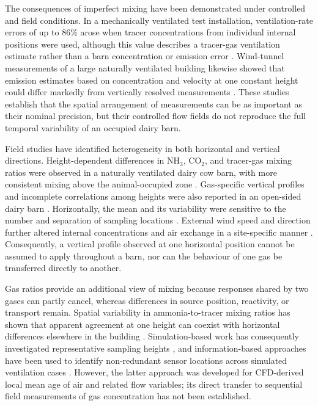 \documentclass[12pt,a4paper]{article}
\begin{document}
The consequences of imperfect mixing have been demonstrated under controlled
and field conditions. In a mechanically ventilated test installation,
ventilation-rate errors of up to 86\% arose when tracer concentrations from
individual internal positions were used, although this value describes a
tracer-gas ventilation estimate rather than a barn concentration or emission
error \citep{VanBuggenhout2009}. Wind-tunnel measurements of a large naturally
ventilated building likewise showed that emission estimates based on
concentration and velocity at one constant height could differ markedly from
vertically resolved measurements \citep{Janke2020}. These studies establish
that the spatial arrangement of measurements can be as important as their
nominal precision, but their controlled flow fields do not reproduce the full
temporal variability of an occupied dairy barn.

Field studies have identified heterogeneity in both horizontal and vertical
directions. Height-dependent differences in \(\mathrm{NH_3}\),
\(\mathrm{CO_2}\), and tracer-gas mixing ratios were observed in a naturally
ventilated dairy cow barn, with more consistent mixing above the
animal-occupied zone \citep{Mendes2015}. Gas-specific vertical profiles and
incomplete correlations among heights were also reported in an open-sided
dairy barn \citep{Durso2024}. Horizontally, the mean and its variability were
sensitive to the number and separation of sampling locations
\citep{Durso2022}. External wind speed and direction further altered internal
concentrations and air exchange in a site-specific manner
\citep{Saha2013}. Consequently, a vertical profile observed at one horizontal
position cannot be assumed to apply throughout a barn, nor can the behaviour
of one gas be transferred directly to another.

Gas ratios provide an additional view of mixing because responses shared by
two gases can partly cancel, whereas differences in source position,
reactivity, or transport remain. Spatial variability in ammonia-to-tracer
mixing ratios has shown that apparent agreement at one height can coexist with
horizontal differences elsewhere in the building \citep{Mendes2015}.
Simulation-based work has consequently investigated representative sampling
heights \citep{Doumbia2021}, and information-based approaches have been used
to identify non-redundant sensor locations across simulated ventilation cases
\citep{Chen2026}. However, the latter approach was developed for
CFD-derived local mean age of air and related flow variables; its direct
transfer to sequential field measurements of gas concentration has not been
established.
\end{document}

